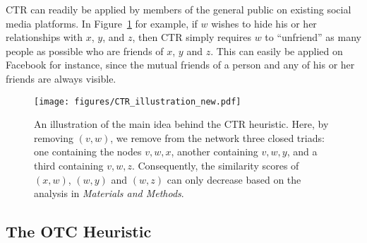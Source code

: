 \documentclass[twocolumn]{article}
\begin{document}
CTR can readily be applied by members of the general public on existing social media platforms. In Figure~\ref{fig:CTR-illustration} for example, if $w$ wishes to hide his or her relationships with $x$, $y$, and $z$, then CTR simply requires $w$ to ``unfriend'' as many people as possible who are friends of $x$, $y$ and $z$. This can easily be applied on Facebook for instance, since the mutual friends of a person and any of his or her friends are always visible.


\begin{figure}[thb]
\centering
\texttt{[image: figures/CTR\_illustration\_new.pdf]}
\caption{An illustration of the main idea behind the CTR heuristic. Here, by removing $(v,w)$, we remove from the network three closed triads: one containing the nodes $v,w,x$, another containing $v,w,y$, and a third containing $v,w,z$. Consequently, the similarity scores of $(x,w)$, $(w,y)$ and $(w,z)$ can only decrease based on the analysis in \textit{Materials and Methods}.}
\label{fig:CTR-illustration}
\end{figure}

\subsection*{The OTC Heuristic}
\label{sec:OTCheuristic}
\end{document}
